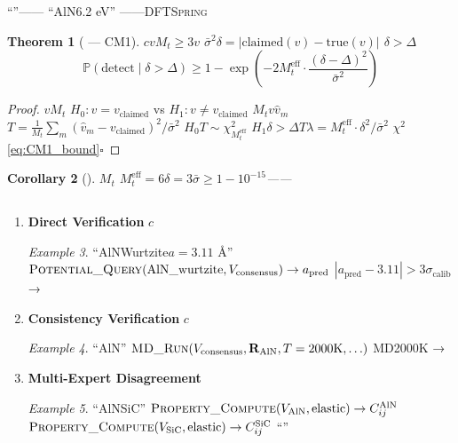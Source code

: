 \documentclass[12pt,a4paper]{article}
\newtheorem{theorem}{Theorem}[section]
\newtheorem{corollary}[theorem]{Corollary}
\theoremstyle{remark}
\newtheorem{example}[theorem]{Example}
\newcommand{\Pbb}{\mathbb{P}}
\newcommand{\Spring}{\textsc{Spring}}
\begin{document}
“”——
“AlN6.2 eV”
——DFT\Spring{}

\begin{theorem}[ — CM1]\label{thm:CM1}
$c$$v$$M_t \geq 3$$v$
$\bar{\sigma}^2$$\delta = |\text{claimed}(v) - \text{true}(v)|$
$\delta > \Delta$
\begin{equation}\label{eq:CM1_bound}
    \Pbb(\text{detect} \mid \delta > \Delta) \geq 1 - \exp\left(-2 M_t^{\text{eff}} \cdot \frac{(\delta - \Delta)^2}{\bar{\sigma}^2}\right)
\end{equation}
\end{theorem}

\begin{proof}
$v$$M_t$
$H_0: v = v_{\text{claimed}}$ vs $H_1: v \neq v_{\text{claimed}}$
$M_t$$v$$\hat{v}_m$
$T = \frac{1}{M_t}\sum_m (\hat{v}_m - v_{\text{claimed}})^2 / \bar{\sigma}^2$
$H_0$$T \sim \chi^2_{M_t^{\text{eff}}}$
$H_1$$\delta > \Delta$$T$$\lambda = M_t^{\text{eff}} \cdot \delta^2 / \bar{\sigma}^2$
$\chi^2$\eqref{eq:CM1_bound}\hfill $\square$
\end{proof}

\begin{corollary}[]\label{cor:CM1}
$M_t$
$M_t^{\text{eff}} = 6$$\delta = 3\bar{\sigma}$$\geq 1 - 10^{-15}$——

\end{corollary}

\subsection{}



\begin{enumerate}[label=\textbf{ \arabic*},leftmargin=*,itemsep=4pt]
    \item \textbf{Direct Verification}
    $c$
    \begin{example}
    “AlNWurtzite$a = 3.11$ \AA”
    $\textsc{Potential\_Query}(\text{AlN\_wurtzite}, V_{\text{consensus}}) \to a_{\text{pred}}$
    $|a_{\text{pred}} - 3.11| > 3\sigma_{\text{calib}}$ → 
    \end{example}

    \item \textbf{Consistency Verification}
    $c$
    \begin{example}
    “AlN”
    $\textsc{MD\_Run}(V_{\text{consensus}}, \mathbf{R}_{\text{AlN}}, T=2000\text{K}, \ldots)$
    MD2000K → 
    \end{example}

    \item \textbf{Multi-Expert Disagreement}
    
    \begin{example}
    “AlNSiC”
    $\textsc{Property\_Compute}(V_{\text{AlN}}, \text{elastic}) \to C_{ij}^{\text{AlN}}$
    $\textsc{Property\_Compute}(V_{\text{SiC}}, \text{elastic}) \to C_{ij}^{\text{SiC}}$
    “”
    \end{example}
\end{enumerate}
\end{document}

